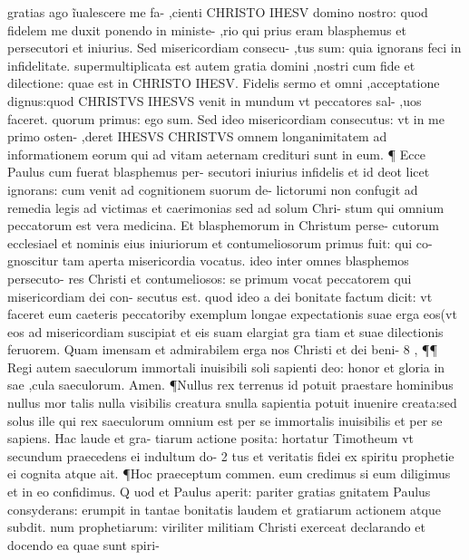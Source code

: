 \documentclass{article}
\begin{document}
\begin{pages}
gratias ago ĩualescere me fa- ,cienti CHRISTO IHESV domino nostro: quod fidelem me duxit ponendo in ministe- ,rio qui prius eram blasphemus et persecutori et iniurius. Sed misericordiam consecu- ,tus sum: quia ignorans feci in infidelitate. supermultiplicata est autem gratia domini ,nostri cum fide et dilectione: quae est in CHRISTO IHESV. Fidelis sermo et omni ,acceptatione dignus:quod CHRISTVS IHESVS venit in mundum vt peccatores sal- ,uos faceret. quorum primus: ego sum. Sed ideo misericordiam consecutus: vt in me primo osten- ,deret IHESVS CHRISTVS omnem longanimitatem ad informationem eorum qui ad vitam aeternam credituri sunt in eum. ¶ Ecce Paulus cum fuerat blasphemus per- secutori iniurius infidelis et id deot licet ignorans: cum venit ad cognitionem suorum de- lictorumi non confugit ad remedia legis ad victimas et caerimonias sed ad solum Chri- stum qui omnium peccatorum est vera medicina. Et blasphemorum in Christum perse- cutorum ecclesiael et nominis eius iniuriorum et contumeliosorum primus fuit: qui co- gnoscitur tam aperta misericordia vocatus. ideo inter omnes blasphemos persecuto- res Christi et contumeliosos: se primum vocat peccatorem qui misericordiam dei con- secutus est. quod ideo a dei bonitate factum dicit: vt faceret eum caeteris peccatoriby exemplum longae expectationis suae erga eos(vt eos ad misericordiam suscipiat et eis suam elargiat gra tiam et suae dilectionis feruorem. Quam imensam et admirabilem erga nos Christi et dei beni- 8 , ¶¶ Regi autem saeculorum immortali inuisibili soli sapienti deo: honor et gloria in sae ,cula saeculorum. Amen. ¶Nullus rex terrenus id potuit praestare hominibus nullus mor talis nulla visibilis creatura snulla sapientia potuit inuenire creata:sed solus ille qui rex saeculorum omnium est per se immortalis inuisibilis et per se sapiens. Hac laude et gra- tiarum actione posita: hortatur Timotheum vt secundum praecedens ei indultum do- 2  tus et veritatis fidei ex spiritu prophetie ei cognita atque ait. ¶Hoc praeceptum commen. eum credimus si eum diligimus et in eo confidimus. Q uod et Paulus aperit: pariter gratias gnitatem Paulus consyderans: erumpit in tantae bonitatis laudem et gratiarum actionem atque subdit. num prophetiarum: viriliter militiam Christi exerceat declarando et docendo ea quae sunt spiri-  \pend

\end{pages}
\end{document}
